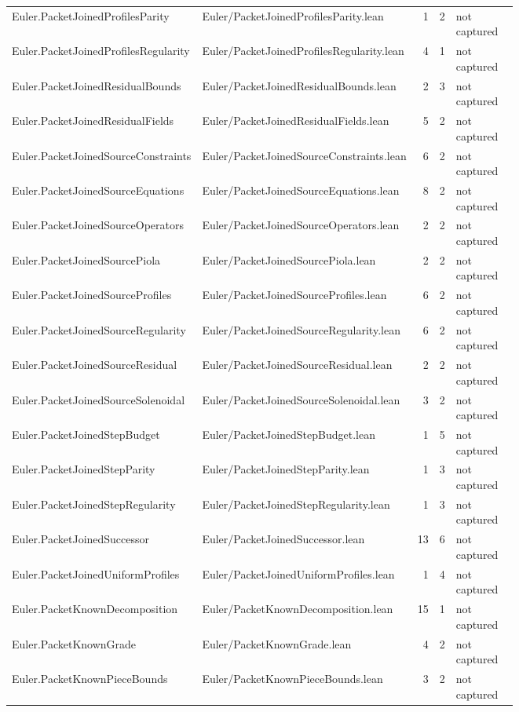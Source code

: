 \documentclass[10pt]{article}
\begin{document}
\begin{longtable}{p{0.28\linewidth}p{0.27\linewidth}r r p{0.20\linewidth}}
Euler.PacketJoinedProfilesParity & Euler/PacketJoinedProfilesParity.lean & 1 & 2 & not captured\\
Euler.PacketJoinedProfilesRegularity & Euler/PacketJoinedProfilesRegularity.lean & 4 & 1 & not captured\\
Euler.PacketJoinedResidualBounds & Euler/PacketJoinedResidualBounds.lean & 2 & 3 & not captured\\
Euler.PacketJoinedResidualFields & Euler/PacketJoinedResidualFields.lean & 5 & 2 & not captured\\
Euler.PacketJoinedSourceConstraints & Euler/PacketJoinedSourceConstraints.lean & 6 & 2 & not captured\\
Euler.PacketJoinedSourceEquations & Euler/PacketJoinedSourceEquations.lean & 8 & 2 & not captured\\
Euler.PacketJoinedSourceOperators & Euler/PacketJoinedSourceOperators.lean & 2 & 2 & not captured\\
Euler.PacketJoinedSourcePiola & Euler/PacketJoinedSourcePiola.lean & 2 & 2 & not captured\\
Euler.PacketJoinedSourceProfiles & Euler/PacketJoinedSourceProfiles.lean & 6 & 2 & not captured\\
Euler.PacketJoinedSourceRegularity & Euler/PacketJoinedSourceRegularity.lean & 6 & 2 & not captured\\
Euler.PacketJoinedSourceResidual & Euler/PacketJoinedSourceResidual.lean & 2 & 2 & not captured\\
Euler.PacketJoinedSourceSolenoidal & Euler/PacketJoinedSourceSolenoidal.lean & 3 & 2 & not captured\\
Euler.PacketJoinedStepBudget & Euler/PacketJoinedStepBudget.lean & 1 & 5 & not captured\\
Euler.PacketJoinedStepParity & Euler/PacketJoinedStepParity.lean & 1 & 3 & not captured\\
Euler.PacketJoinedStepRegularity & Euler/PacketJoinedStepRegularity.lean & 1 & 3 & not captured\\
Euler.PacketJoinedSuccessor & Euler/PacketJoinedSuccessor.lean & 13 & 6 & not captured\\
Euler.PacketJoinedUniformProfiles & Euler/PacketJoinedUniformProfiles.lean & 1 & 4 & not captured\\
Euler.PacketKnownDecomposition & Euler/PacketKnownDecomposition.lean & 15 & 1 & not captured\\
Euler.PacketKnownGrade & Euler/PacketKnownGrade.lean & 4 & 2 & not captured\\
Euler.PacketKnownPieceBounds & Euler/PacketKnownPieceBounds.lean & 3 & 2 & not captured\\

\end{longtable}
\end{document}
